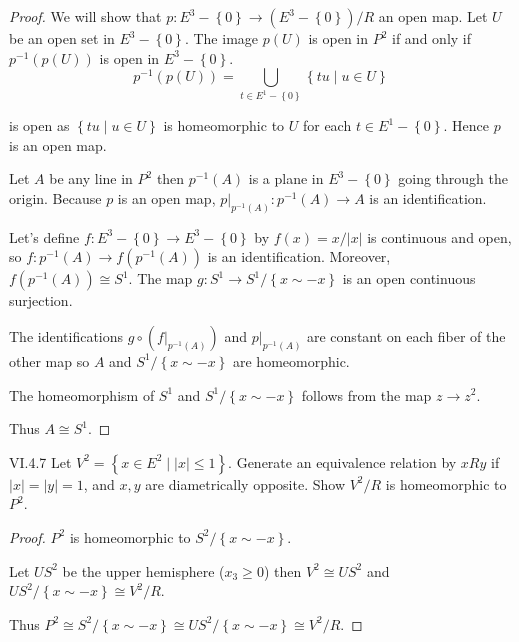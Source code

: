 \begin{proof}
	We will show that \( p: E^{3} - \left\{ 0 \right\} \to (E^{3} - \left\{ 0 \right\})/R \) an open map. Let \( U \) be an open set in \( E^{3} - \left\{ 0 \right\} \). The image \( p(U) \) is open in \( P^{2} \) if and only if \( p^{-1}(p(U)) \) is open in \( E^{3} - \left\{ 0 \right\} \).
	\[
		p^{-1}(p(U)) = \bigcup_{t \in E^{1} - \left\{ 0 \right\}} \left\{ tu \mid u \in U \right\}
	\]

	is open as \( \left\{ tu \mid u \in U \right\} \) is homeomorphic to \( U \) for each \( t \in E^{1} - \left\{ 0 \right\} \). Hence \( p \) is an open map.

	Let \( A \) be any line in \( P^{2} \) then \( p^{-1}(A) \) is a plane in \( E^{3} - \left\{ 0 \right\} \) going through the origin. Because \( p \) is an open map, \( p\vert_{p^{-1}(A)}: p^{-1}(A) \to A \) is an identification.

	Let's define \( f: E^{3} - \left\{ 0 \right\} \to E^{3} - \left\{ 0 \right\} \) by \( f(x) = x/\left\vert x \right\vert \) is continuous and open, so \( f: p^{-1}(A) \to f(p^{-1}(A)) \) is an identification. Moreover, \( f(p^{-1}(A)) \cong S^{1} \). The map \( g: S^{1} \to S^{1}/\left\{ x \sim -x \right\} \) is an open continuous surjection.

	The identifications \( g \circ (f\vert_{p^{-1}(A)}) \) and \( p\vert_{p^{-1}(A)} \) are constant on each fiber of the other map so \( A \) and \( S^{1}/\left\{ x \sim -x \right\} \) are homeomorphic.

	The homeomorphism of \( S^{1} \) and \( S^{1}/\left\{ x \sim -x \right\} \) follows from the map \( z \to z^{2} \).

	Thus \( A \cong S^{1} \).
\end{proof}

\begin{problem}{VI.4.7}
Let \( V^{2} = \left\{ x \in E^{2} \mid \left\vert x \right\vert \le 1 \right\} \). Generate an equivalence relation by \( x R y \) if \( \left\vert x \right\vert = \left\vert y \right\vert = 1 \), and \( x, y \) are diametrically opposite. Show \( V^{2}/R \) is homeomorphic to \( P^{2} \).
\end{problem}

\begin{proof}
	\( P^{2} \) is homeomorphic to \( S^{2}/\left\{ x \sim -x \right\} \).

	Let \( US^{2} \) be the upper hemisphere (\( x_{3} \ge 0 \)) then \( V^{2} \cong US^{2} \) and \( US^{2}/\left\{ x \sim -x \right\} \cong V^{2}/R \).

	Thus \( P^{2} \cong S^{2}/\left\{ x \sim -x \right\} \cong US^{2}/\left\{ x \sim -x \right\} \cong V^{2}/R \).
\end{proof}

